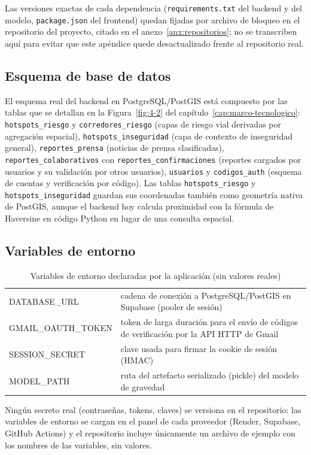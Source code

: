 Las versiones exactas de cada dependencia (\texttt{requirements.txt} del
backend y del modelo, \texttt{package.json} del frontend) quedan fijadas
por archivo de bloqueo en el repositorio del proyecto, citado en el
anexo~\ref{anx:repositorios}; no se transcriben aquí para evitar que este
apéndice quede desactualizado frente al repositorio real.

\subsection{Esquema de base de datos}

El esquema real del backend en PostgreSQL/PostGIS está compuesto por las
tablas que se detallan en la Figura~\ref{fig:4-2} del
capítulo~\ref{cap:marco-tecnologico}: \texttt{hotspots\_riesgo} y
\texttt{corredores\_riesgo} (capas de riesgo vial derivadas por
agregación espacial), \texttt{hotspots\_inseguridad} (capa de contexto
de inseguridad general), \texttt{reportes\_prensa} (noticias de prensa
clasificadas), \texttt{reportes\_colaborativos} con
\texttt{reportes\_confirmaciones} (reportes cargados por usuarios y su
validación por otros usuarios), \texttt{usuarios} y
\texttt{codigos\_auth} (esquema de cuentas y verificación por código).
Las tablas \texttt{hotspots\_riesgo} y \texttt{hotspots\_inseguridad}
guardan sus coordenadas también como geometría nativa de PostGIS, aunque
el backend hoy calcula proximidad con la fórmula de Haversine en código
Python en lugar de una consulta espacial.

\subsection{Variables de entorno}

\begin{table}[H]
    \centering
    \caption{Variables de entorno declaradas por la aplicación (sin valores reales)}
    \label{tab:env}
    \small
    \begin{tabularx}{\textwidth}{l L}
        \toprule
         &  \\
        \midrule
        DATABASE\_URL & cadena de conexión a PostgreSQL/PostGIS en Supabase (pooler de sesión) \\
        GMAIL\_OAUTH\_TOKEN & token de larga duración para el envío de códigos de verificación por la API HTTP de Gmail \\
        SESSION\_SECRET & clave usada para firmar la cookie de sesión (HMAC) \\
        MODEL\_PATH & ruta del artefacto serializado (pickle) del modelo de gravedad \\
        \bottomrule
    \end{tabularx}
\end{table}

Ningún secreto real (contraseñas, tokens, claves) se versiona en el
repositorio: las variables de entorno se cargan en el panel de cada
proveedor (Render, Supabase, GitHub Actions) y el repositorio incluye
únicamente un archivo de ejemplo con los nombres de las variables, sin
valores.
